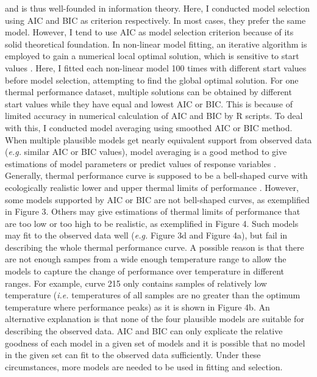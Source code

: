 \documentclass[11pt]{article}
\begin{document}
  and is thus well-founded in information theory.  
  Here, I conducted model selection using AIC and BIC as criterion respectively. 
  In most cases, they prefer the same model. However, I tend to use AIC as model selection criterion because of its solid 
  theoretical foundation.
  \newline
  In non-linear model fitting, an iterative algorithm is employed to gain a numerical local optimal solution, 
  which is sensitive to start values 
  \cite{ranganathan2004levenberg, lourakis2005brief}. 
  Here, 
  I fitted each non-linear model 100 times with different start values before model selection, attempting to 
  find the global optimal solution. For one thermal 
  performance dataset, multiple solutions can be obtained by different start values while they have equal and 
  lowest AIC or BIC. This is because of limited accuracy in numerical calculation of AIC and BIC 
  by R scripts. To deal with this, I conducted model averaging using smoothed AIC or BIC method. 
  When multiple plausible models get nearly equivalent support from observed data (\textit{e.g.} similar AIC or BIC values), 
  model averaging is a good method 
  to give estimations of model parameters or predict values of response variables \cite{johnson2004model}.
  \newline
  Generally, thermal performance curve is supposed to be a bell-shaped curve with ecologically realistic 
  lower and upper thermal limits of performance \cite{sinclair2016can,krenek2011thermal}. 
  However, some models supported by AIC or BIC are not bell-shaped curves, 
  as exemplified in Figure 3. Others may give estimations of thermal limits of performance that are too low or too high to 
  be realistic, as exemplified in Figure 4. Such models may fit to the observed data well (\textit{e.g.} Figure 3d and Figure 4a), but 
  fail in describing the whole thermal performance curve. A possible reason is that there are not enough sampes from a wide 
  enough temperature range to allow the models to capture the change of performance over temperature in different ranges. 
  For example, curve 215 
  only contains samples of relatively low temperature (\textit{i.e.} temperatures of all samples are no greater 
  than the optimum 
  temperature  
  where performance peaks) as it is shown in Figure 4b. An alternative explanation is that none of the four plausible models 
  are suitable for describing the observed data. 
  AIC and BIC can only explicate the relative goodness of each model in a given set of models \cite{johnson2004model, 
  buckland1997model, zucchini2000introduction}
   and it 
  is possible that no model in the given set can fit to the observed data sufficiently. Under these circumstances, more 
  models are needed to be used in fitting and selection.
\end{document}
